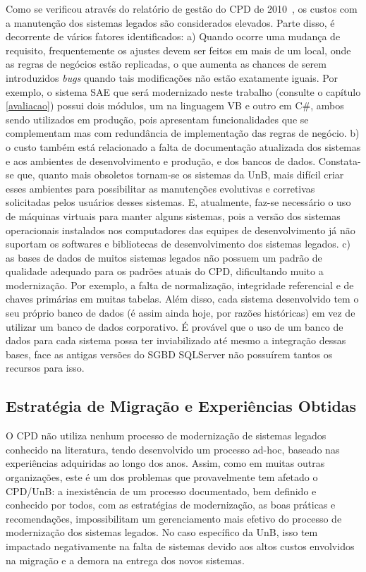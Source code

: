 Como se verificou através do relatório de gestão do \acrshort{CPD} de 2010~\cite{PortalCPD:2015}, os custos com a manuten\c c\~{a}o dos sistemas legados são considerados elevados. Parte disso, é decorrente de vários fatores identificados: a) Quando ocorre uma mudança de requisito, frequentemente os ajustes devem ser feitos em mais de um local, onde as regras de negócios estão replicadas, o que aumenta as chances de serem introduzidos \textit{bugs} quando tais modificações não estão exatamente iguais. Por exemplo, o sistema \acrfull{SAE} que será modernizado neste trabalho (consulte o capítulo \ref{avaliacao}) possui dois módulos, um na linguagem \acrshort{VB} e outro em C\#, ambos sendo utilizados em produção, pois apresentam funcionalidades que se complementam mas com redundância de implementação das regras de negócio. b) o custo também está relacionado a falta de documentação atualizada dos sistemas e aos ambientes de desenvolvimento e produção, e dos bancos de dados. Constata-se que, quanto mais obsoletos tornam-se os sistemas da \acrshort{UnB}, mais difícil criar esses ambientes para possibilitar as manutenções evolutivas e corretivas solicitadas pelos usuários desses sistemas. E, atualmente, faz-se necessário o uso de máquinas virtuais para manter alguns sistemas, pois a versão dos sistemas operacionais instalados nos computadores das equipes de desenvolvimento já não suportam os softwares e bibliotecas de desenvolvimento dos sistemas legados. c) as bases de dados de muitos sistemas legados não possuem um padrão de qualidade adequado para os padrões atuais do \acrshort{CPD}, dificultando muito a modernização. Por exemplo, a falta de normalização, integridade referencial e de chaves primárias em muitas tabelas. Além disso, cada sistema desenvolvido tem o seu próprio banco de dados (é assim ainda hoje, por razões históricas) em vez de utilizar um banco de dados corporativo. É provável que o uso de um banco de dados para cada sistema possa ter inviabilizado até mesmo a integração dessas bases, face as antigas versões do \acrfull{SGBD} SQL\-Server não possuírem tantos os recursos para isso.


\subsection{Estratégia de Migração e Experiências Obtidas}

O \acrshort{CPD} não utiliza nenhum processo de modernização de sistemas legados conhecido na literatura, tendo desenvolvido um processo ad-hoc, baseado nas experiências adquiridas ao longo dos anos. Assim, como em muitas outras organizações, este é um dos problemas que provavelmente tem afetado o CPD/UnB: a inexistência de um processo documentado, bem definido e conhecido por todos, com as estratégias de modernização, as boas práticas e recomendações, impossibilitam um gerenciamento mais efetivo do processo de modernização dos sistemas legados. No caso específico da UnB, isso tem impactado negativamente na falta de sistemas devido aos altos custos envolvidos na migração e a demora na entrega dos novos sistemas.

